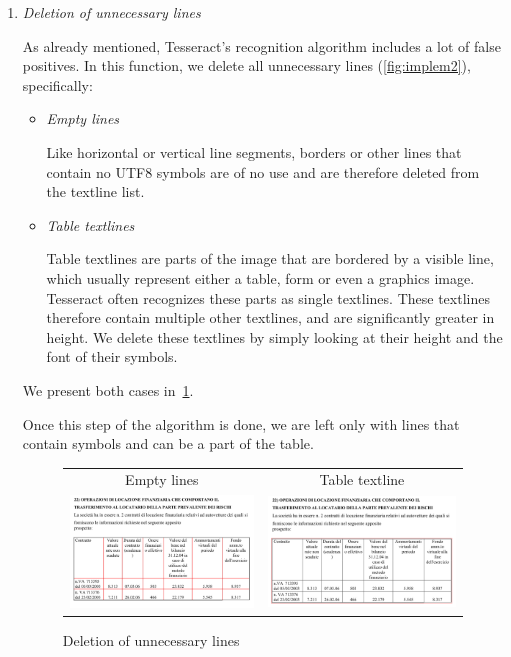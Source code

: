 \begin{enumerate}
\item \emph{Deletion of unnecessary lines}

As already mentioned, Tesseract's recognition algorithm includes a lot of false positives. In this function, we delete all unnecessary lines (\cref{fig:implem2}), specifically:

\begin{itemize}
\item \emph{Empty lines}

Like horizontal or vertical line segments, borders or other lines that contain no UTF8 symbols are of no use and are therefore deleted from the textline list.

\item \emph{Table textlines}

Table textlines are parts of the image that are bordered by a visible line, which usually represent either a table, form or even a graphics image. Tesseract often recognizes these parts as single textlines. These textlines therefore contain multiple other textlines, and are significantly greater in height. We delete these textlines by simply looking at their height and the font of their symbols.
\end{itemize}

We present both cases in~\cref{fig:deletionOfLines}.

Once this step of the algorithm is done, we are left only with lines that contain symbols and can be a part of the table.

\begin{figure}[t]
\centering
{\sffamily
\begin{tabular}{cc}
Empty lines & Table textline \\
\includegraphics[width=0.4\linewidth]{img/implementation/textlineEmpty.png}
&
\includegraphics[width=0.4\linewidth]{img/implementation/textlineTable.png}\\
\end{tabular}
}
\caption{Deletion of unnecessary lines}
\label{fig:deletionOfLines}
\end{figure}


\end{enumerate}
